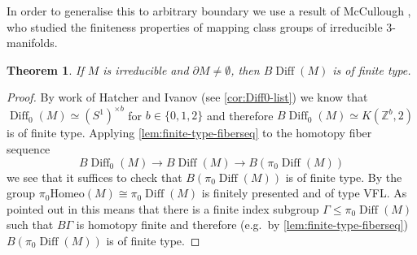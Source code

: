 \documentclass{amsart}
\theoremstyle{plain}
\newtheorem{thm}{Theorem}[section]
\theoremstyle{definition}
\DeclareMathOperator\Diff{Diff}
\newcommand{\BDiff}{B\!\Diff}
\newcommand{\bbZ}{\mathbb{Z}}
\begin{document}
In order to generalise this to arbitrary boundary we use a result of McCullough \cite{McCullough1991}, who studied the finiteness properties of mapping class groups of irreducible $3$-manifolds.
\begin{thm}\label{thm:finite-type-irreducible}
    If $M$ is irreducible and $\partial M \neq \emptyset$, then $\BDiff(M)$ is of finite type.
\end{thm}
\begin{proof}
    By work of Hatcher and Ivanov (see \cref{cor:Diff0-list}) we know that $\Diff_0(M) \simeq (S^1)^{\times b}$ for $b\in \{0,1,2\}$ and therefore $\BDiff_0(M) \simeq K(\bbZ^b, 2)$ is of finite type.
    Applying \cref{lem:finite-type-fiberseq} to the homotopy fiber sequence
    \[
        \BDiff_0(M) \longrightarrow \BDiff(M) \longrightarrow B(\pi_0\Diff(M))
    \]
    we see that it suffices to check that $B(\pi_0\Diff(M))$ is of finite type.
    By \cite[Theorem 7.1]{McCullough1991} the group $\pi_0\mathrm{Homeo}(M) \cong \pi_0\Diff(M)$ is finitely presented and of type VFL.
    As pointed out in \cite[Theorem 1.1]{McCullough1991} this means that there is a finite index subgroup $\Gamma \le \pi_0\Diff(M)$ such that $B\Gamma$ is homotopy finite 
    and therefore (e.g.~by \cref{lem:finite-type-fiberseq}) $B(\pi_0\Diff(M))$ is of finite type.
\end{proof}
\end{document}
